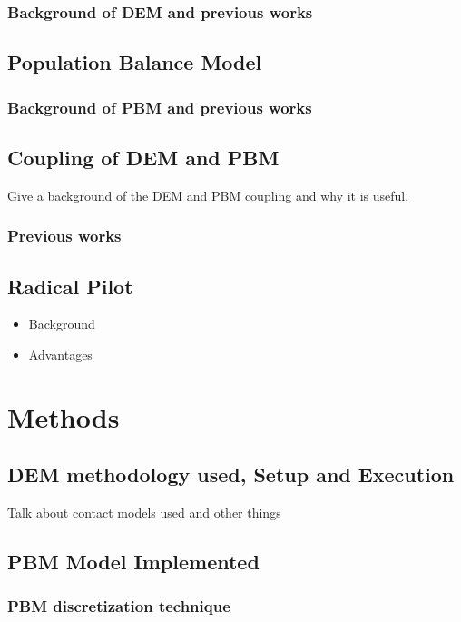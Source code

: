 \documentclass[preprint,11pt,authoryear]{elsarticle}
\begin{document}
\subsubsection{Background of DEM and previous works}

\subsection{Population Balance Model}

\subsubsection{Background of PBM and previous works}

\subsection{Coupling of DEM and PBM}
Give a  background of the DEM and PBM coupling and why it is useful.
\subsubsection{Previous works}
\subsection{Radical Pilot}
\begin{itemize}
\item{Background}
\item{Advantages}
\end{itemize}

\section{Methods}
\subsection{DEM methodology used, Setup and Execution}
Talk about contact models used and other things

\subsection{PBM Model Implemented}

\subsubsection{PBM discretization technique}
\end{document}
